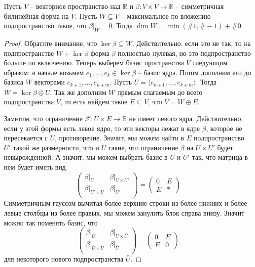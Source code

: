 \begin{claim}
Пусть $V$ -- векторное пространство над $\mathbb R$ и $\beta\colon V\times V\to \mathbb R$ -- симметричная билинейная форма на $V$.
Пусть $W\subseteq V$ -- максимальное по вложению подпространство такое, что $\beta|_W = 0$.
Тогда $\dim W = \min(\#1, \#-1) + \#0$.
\end{claim}
\begin{proof}
Обратите внимание, что $\ker \beta \subseteq W$.
Действительно, если это не  так, то на подпространстве $W+\ker \beta$ форма $\beta$ полностью нулевая, но это подпространство больше по включению.
Теперь выберем базис пространства $V$ следующим образом: в начале возьмем $e_1,\ldots,e_k \in \ker \beta$ -- базис ядра.
Потом дополним его до базиса $W$ векторами $e_{k+1},\ldots,e_{k+m}$.
Пусть $U = \langle e_{k+1},\ldots,e_{k+m}\rangle$.
Тогда $W = \ker \beta \oplus U$.
Так же дополним $W$ прямым слагаемым до всего подпространства $V$, то есть найдем такое $E\subseteq V$, что $V = W \oplus E$.

Заметим, что ограничение $\beta'\colon U\times E \to \mathbb R$ не имеет левого ядра.
Действительно, если у этой формы есть левое ядро, то эти векторы лежат в ядре $\beta$, которое не пересекается с $U$, противоречие.
Значит, мы можем найти в $E$ подпространство $U'$ такой же размерности, что и $U$ такие, что ограничение $\beta$ на $U\times U'$ будет невырожденной.
А значит, мы можем выбрать базис в $U$ и $U'$ так, что матрица в нем будет иметь вид
\[
\begin{pmatrix}
{\beta|_{U}}&{\beta|_{U\times U'}}\\
{\beta|_{U'\times U}}&{\beta|_{U'}}\\
\end{pmatrix}
=
\begin{pmatrix}
{0}&{E}\\
{E}&{*}
\end{pmatrix}
\]
Симметричным гауссом вычитая более верхние строки из более нижних и более левые столбцы из более правых, мы можем занулить блок справа внизу.
Значит можно так поменять базис, что
\[
\begin{pmatrix}
{\beta|_{U}}&{\beta|_{U\times \bar U}}\\
{\beta|_{\bar U\times U}}&{\beta|_{\bar U}}\\
\end{pmatrix}
=
\begin{pmatrix}
{0}&{E}\\
{E}&{0}
\end{pmatrix}
\]
для некоторого нового подпространства $\bar U$.


\end{proof}
